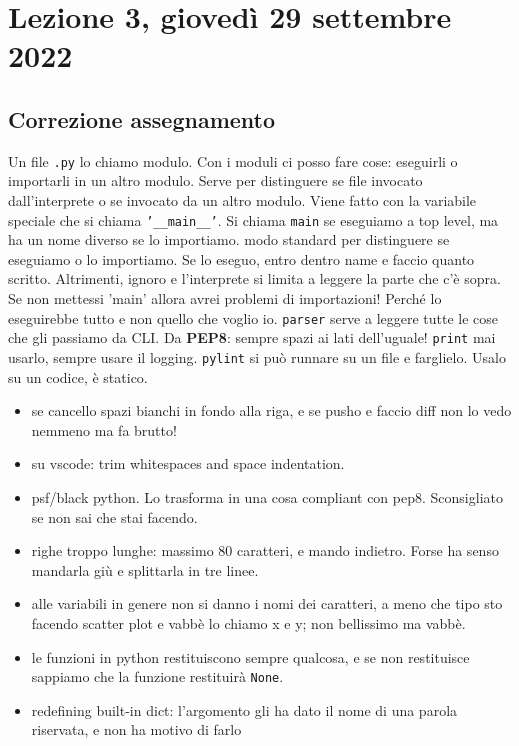 \documentclass[10pt, a4paper, titlepage]{book}
\begin{document}
\section{Lezione 3, giovedì 29 settembre 2022}

\subsection{Correzione assegnamento}

Un file \texttt{.py} lo chiamo modulo. Con i moduli ci posso fare cose: eseguirli o importarli in un altro modulo.
Serve per distinguere se file invocato dall'interprete o se invocato da un altro modulo. Viene fatto con la variabile speciale che si chiama \texttt{'__main__'}. 
Si chiama \texttt{main} se eseguiamo a top level, ma ha un nome diverso se lo importiamo.
modo standard per distinguere se eseguiamo o lo importiamo.
Se lo eseguo, entro dentro name e faccio quanto scritto. Altrimenti, ignoro e l'interprete si limita a leggere la parte che c'è sopra.
Se non mettessi 'main' allora avrei problemi di importazioni! Perché lo eseguirebbe tutto e non quello che voglio io.
\texttt{parser} serve a leggere tutte le cose che gli passiamo da  CLI. 
Da \textbf{PEP8}: sempre spazi ai lati dell'uguale!
\texttt{print} mai usarlo, sempre usare il logging.
\texttt{pylint} si può runnare su un file e farglielo. Usalo su un codice, è statico.
\begin{itemize}
	\item se cancello spazi bianchi in fondo alla riga, e se pusho e faccio diff non lo vedo nemmeno ma fa brutto!
	\item su vscode: trim whitespaces and space indentation.
	\item psf/black python. Lo trasforma in una cosa compliant con pep8. Sconsigliato se non sai che stai facendo.
	\item righe troppo lunghe: massimo 80 caratteri, e mando indietro. Forse ha senso mandarla giù e splittarla in tre linee.
	\item alle variabili in genere non si danno i nomi dei caratteri, a meno che tipo sto facendo scatter plot e vabbè lo chiamo x e y; non bellissimo ma vabbè.
	\item le funzioni in python restituiscono sempre qualcosa, e se non restituisce sappiamo che la funzione restituirà \texttt{None}.
	\item redefining built-in dict: l'argomento gli ha dato il nome di una parola riservata, e non ha motivo di farlo
 
\end{itemize}
\end{document}
